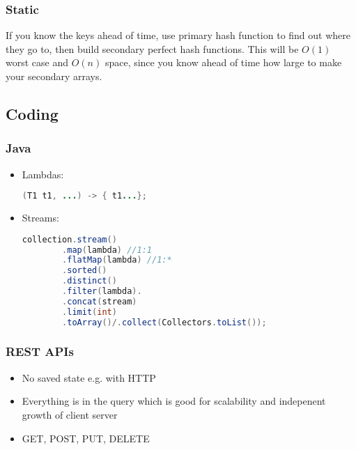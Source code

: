 \documentclass[10pt]{article}
\begin{document}
\subsubsection{Static}
If you know the keys ahead of time, use primary hash function to find out where they go to, then build secondary perfect hash functions. This will be $O(1)$ worst case and $O(n)$ space, since you know ahead of time how large to make your secondary arrays.

\subsection{Coding}
\subsubsection{Java}
\begin{itemize}
    \item Lambdas:
    \begin{lstlisting}[language=java]
    (T1 t1, ...) -> { t1...};
    \end{lstlisting}
    \item Streams:
    \begin{lstlisting}[language=java]
    collection.stream()
        .map(lambda) //1:1
        .flatMap(lambda) //1:*
        .sorted()
        .distinct()
        .filter(lambda).
        .concat(stream)
        .limit(int)
        .toArray()/.collect(Collectors.toList());
    \end{lstlisting}
\end{itemize}

\subsubsection{REST APIs}
\begin{itemize}
    \item No saved state e.g. with HTTP
    \item Everything is in the query which is good for scalability and indepenent growth of client server
    \item GET, POST, PUT, DELETE
\end{itemize}
\end{document}
